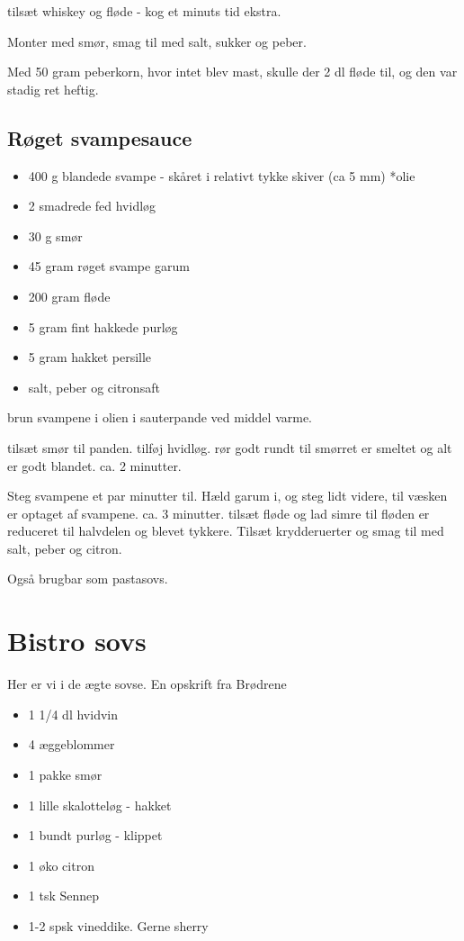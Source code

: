 \documentclass[
]{book}
\providecommand{\tightlist}{%
  \setlength{\itemsep}{0pt}\setlength{\parskip}{0pt}}
\begin{document}
tilsæt whiskey og fløde - kog et minuts tid ekstra.

Monter med smør, smag til med salt, sukker og peber.

Med 50 gram peberkorn, hvor intet blev mast, skulle der
2 dl fløde til, og den var stadig ret heftig.

\hypertarget{ruxf8get-svampesauce}{%
\subsection{Røget svampesauce}\label{ruxf8get-svampesauce}}

\begin{itemize}
\tightlist
\item
  400 g blandede svampe - skåret i relativt tykke skiver (ca 5 mm)
  *olie
\item
  2 smadrede fed hvidløg
\item
  30 g smør
\item
  45 gram røget svampe garum
\item
  200 gram fløde
\item
  5 gram fint hakkede purløg
\item
  5 gram hakket persille
\item
  salt, peber og citronsaft
\end{itemize}

brun svampene i olien i sauterpande ved middel varme.

tilsæt smør til panden. tilføj hvidløg. rør godt rundt til smørret er smeltet og alt er godt
blandet. ca. 2 minutter.

Steg svampene et par minutter til. Hæld garum i, og steg lidt videre, til
væsken er optaget af svampene. ca. 3 minutter.
tilsæt fløde og lad simre til fløden er reduceret til halvdelen og blevet tykkere.
Tilsæt krydderuerter og smag til med salt, peber og citron.

Også brugbar som pastasovs.

\hypertarget{bistro-sovs}{%
\section{Bistro sovs}\label{bistro-sovs}}

Her er vi i de ægte sovse. En opskrift fra Brødrene

\begin{itemize}
\tightlist
\item
  1 1/4 dl hvidvin
\item
  4 æggeblommer
\item
  1 pakke smør
\item
  1 lille skalotteløg - hakket
\item
  1 bundt purløg - klippet
\item
  1 øko citron
\item
  1 tsk Sennep
\item
  1-2 spsk vineddike. Gerne sherry
\end{itemize}
\end{document}
